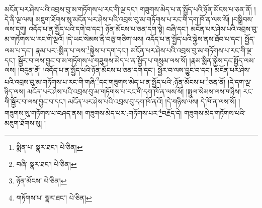 མངོན་པར་ཤེས་པའི་འབྲས་བུ་མ་གཏོགས་པ་རང་གི་ལྔ་དང་། གཟུགས་མེད་པ་ན་སྤྱོད་པའི་ཉོན་མོངས་པ་ཅན་ནོ། །དེ་ནི་ལྔ་ལས། མཇུག་ཐོགས་སུ་མངོན་པར་ཤེས་པའི་འབྲས་བུ་མ་གཏོགས་པ་རང་གི་དག་ཁོ་ན་ལས་སོ། །བསྒྲིབས་ལས་དགུ། འདོད་པ་ན་སྤྱོད་པའི་དགེ་བ་དང་། ཉོན་མོངས་པ་ཅན་དག་སྟེ། བཞི་དང་། མངོན་པར་ཤེས་པའི་འབྲས་བུ་མ་གཏོགས་པ་རང་གི་ལྔའོ། །དེ་ཡང་སེམས་ནི་བཅུ་གཅིག་ལས། འདོད་པ་ན་སྤྱོད་པའི་སྐྱེས་ནས་ཐོབ་པ་དང་། སྤྱོད་ལམ་པ་དང་། རྣམ་པར་:སྨིན་པ་ལས་\footnote{སྨིན་པ་  སྣར་ཐང་།  པེ་ཅིན། }སྐྱེས་པ་དག་དང་། མངོན་པར་ཤེས་པའི་འབྲས་བུ་མ་གཏོགས་པ་རང་གི་ལྔ་དང་། སྦྱོར་བ་ལས་བྱུང་བ་མ་གཏོགས་པ་གཟུགས་མེད་པ་ན་སྤྱོད་པ་གསུམ་ལས་སོ། །རྣམ་སྨིན་སྐྱེས་དང་སྤྱོད་ལམ་ལས། །བདུན་ནོ། །འདོད་པ་ན་སྤྱོད་པའི་ཉོན་མོངས་པ་ཅན་དག་དང་། སྦྱོར་བ་ལས་བྱུང་བ་དང་། མངོན་པར་ཤེས་པའི་འབྲས་བུ་མ་གཏོགས་པ་རང་གི་གཞི་\footnote{བཞི་  སྣར་ཐང་།  པེ་ཅིན། }དང་གཟུགས་མེད་པ་ན་སྤྱོད་པའི་:ཉོན་མོངས་པ་\footnote{ཉོན་མོངས་  པེ་ཅིན། }ཅན་ནོ། །དེ་དག་ལྔ་ཉིད་ལས། མངོན་པར་ཤེས་པའི་འབྲས་བུ་མ་གཏོགས་པ་རང་གི་དག་ཁོ་ན་ལས་སོ། །སྤྲུལ་སེམས་ལས་གཉིས། རང་གི་སྦྱོར་བ་ལས་བྱུང་བ་དང་། མངོན་པར་ཤེས་པའི་འབྲས་བུ་དག་ཁོ་ནའོ། །དེ་གཉིས་ལས། དེ་ཁོ་ན་ལས་སོ། །གཟུགས་སུ་གཏོགས་པ་བཤད་ནས། གཟུགས་མེད་པར་:གཏོགས་པར་\footnote{གཏོགས་པ་  སྣར་ཐང་།  པེ་ཅིན། }བརྗོད་དེ། གཟུགས་མེད་གཏོགས་པའི་མཇུག་ཐོགས་སུ། །
